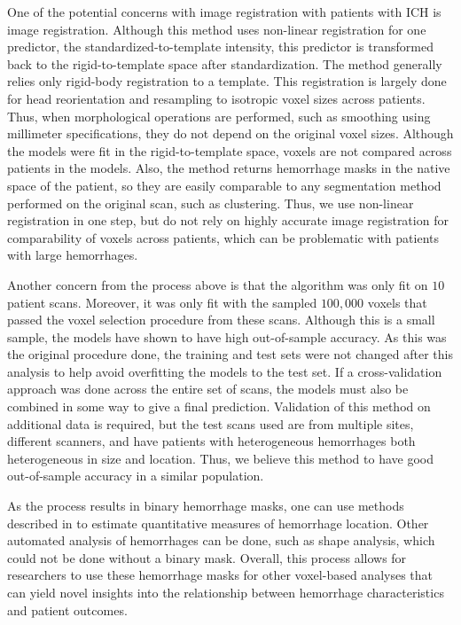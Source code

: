 \documentclass{elsarticle_nonatbib}\usepackage[]{graphicx}\usepackage[]{color}
\begin{document}
One of the potential concerns with image registration with patients with ICH is image registration.  Although this method uses non-linear registration for one predictor, the standardized-to-template intensity, this predictor is transformed back to the rigid-to-template space after standardization.  The method generally relies only rigid-body registration to a template.  This registration is largely done for head reorientation and resampling to isotropic voxel sizes across patients.  Thus, when morphological operations  are performed, such as smoothing using millimeter specifications, they do not depend on the original voxel sizes.  Although the models were fit in the rigid-to-template space, voxels are not compared across patients in the models.  Also, the method returns hemorrhage masks in the native space of the patient, so they are easily comparable to any segmentation method performed on the original scan, such as clustering.  Thus, we use non-linear registration in one step, but do not rely on highly accurate image registration for comparability of voxels across patients, which can be problematic with patients with large hemorrhages.


Another concern from the process above is that the algorithm was only fit on $10$ patient scans.  Moreover, it was only fit with the sampled $100{,}000$ voxels that passed the voxel selection procedure from these scans.  Although this is a small sample, the models have shown to have high out-of-sample accuracy.  As this was the original procedure done, the training and test sets were not changed after this analysis to help avoid overfitting the models to the test set.  If a cross-validation approach was done across the entire set of scans,  the models must also be combined in some way to give a final prediction.  Validation of this method on additional data is required, but the test scans used are from multiple sites, different scanners, and have patients with heterogeneous hemorrhages both heterogeneous in size and location.  Thus, we believe this method to have good out-of-sample accuracy in a similar population.

As the process results in binary hemorrhage masks, one can use methods described in \citet{muschelli2015quantitative} to estimate quantitative measures of hemorrhage location.  Other automated analysis of hemorrhages can be done, such as shape analysis, which could not be done without a binary mask.  Overall, this process allows for researchers to use these hemorrhage masks for other voxel-based analyses that can yield novel insights into the relationship between hemorrhage characteristics and patient outcomes.
\end{document}
